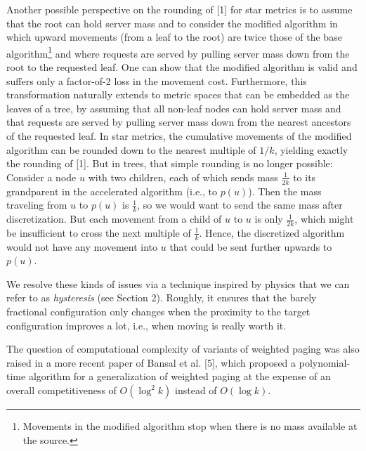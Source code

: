 \documentclass[10pt,a4paper]{article}
\begin{document}
Another possible perspective on the rounding of [1] for star metrics is to assume that the root can hold server mass and to consider the modified algorithm in which upward movements (from a leaf to the root) are twice those of the base algorithm\footnote{Movements in the modified algorithm stop when there is no mass available at the source.} and where requests are served by pulling server mass down from the root to the requested leaf. One can show that the modified algorithm is valid and suffers only a factor-of-2 loss in the movement cost. Furthermore, this transformation naturally extends to metric spaces that can be embedded as the leaves of a tree, by assuming that all non-leaf nodes can hold server mass and that requests are served by pulling server mass down from the nearest ancestors of the requested leaf. In star metrics, the cumulative movements of the modified algorithm can be rounded down to the nearest multiple of $1/k$, yielding exactly the rounding of [1]. But in trees, that simple rounding is no longer possible: Consider a node $u$ with two children, each of which sends mass $\frac{1}{2k}$ to its grandparent in the accelerated algorithm (i.e., to $p(u)$). Then the mass traveling from $u$ to $p(u)$ is $\frac{1}{k}$, so we would want to send the same mass after discretization. But each movement from a child of $u$ to $u$ is only $\frac{1}{2k}$, which might be insufficient to cross the next multiple of $\frac{1}{k}$. Hence, the discretized algorithm would not have any movement into $u$ that could be sent further upwards to $p(u)$.\par




We resolve these kinds of issues via a technique inspired by physics that we can refer to as \emph{hysteresis} (see Section 2). Roughly, it ensures that the barely fractional configuration only changes when the proximity to the target configuration improves a lot, i.e., when moving is really worth it.\par




The question of computational complexity of variants of weighted paging was also raised in a more recent paper of Bansal et al. [5], which proposed a polynomial-time algorithm for a generalization of weighted paging at the expense of an overall competitiveness of $O(\log^{2}k)$ instead of $O(\log k)$.\par
\end{document}
